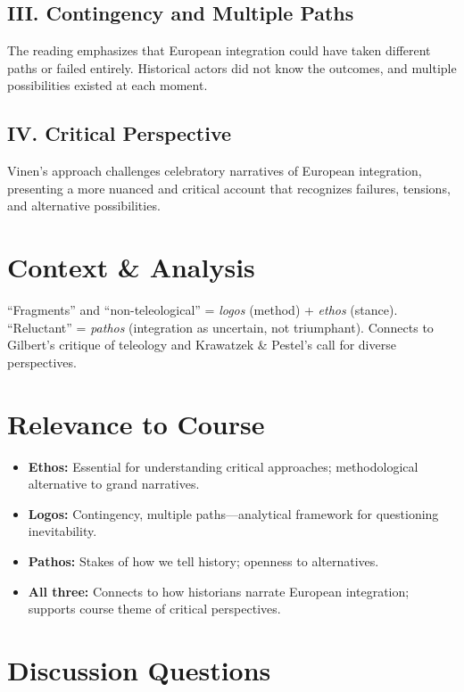 \documentclass[11pt,a4paper]{article}
\begin{document}
\subsection*{III. Contingency and Multiple Paths}

The reading emphasizes that European integration could have taken different paths or failed entirely. Historical actors did not know the outcomes, and multiple possibilities existed at each moment.

\subsection*{IV. Critical Perspective}

Vinen's approach challenges celebratory narratives of European integration, presenting a more nuanced and critical account that recognizes failures, tensions, and alternative possibilities.

\section*{Context \& Analysis}

``Fragments'' and ``non-teleological'' = \textit{logos} (method) + \textit{ethos} (stance). ``Reluctant'' = \textit{pathos} (integration as uncertain, not triumphant). Connects to Gilbert's critique of teleology and Krawatzek \& Pestel's call for diverse perspectives.

\section*{Relevance to Course}

\begin{itemize}
\item \textbf{Ethos:} Essential for understanding critical approaches; methodological alternative to grand narratives.
\item \textbf{Logos:} Contingency, multiple paths---analytical framework for questioning inevitability.
\item \textbf{Pathos:} Stakes of how we tell history; openness to alternatives.
\item \textbf{All three:} Connects to how historians narrate European integration; supports course theme of critical perspectives.
\end{itemize}

\section*{Discussion Questions}
\end{document}
